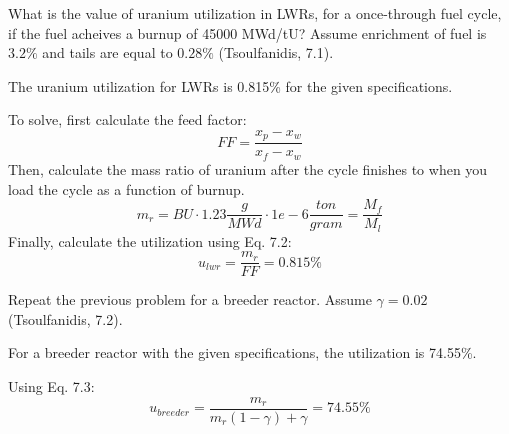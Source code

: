 \documentclass[11pt,answers,addpoints]{exam}
\begin{document}
\begin{questions}
        \question[50] What is the value of uranium utilization in LWRs, for a 
        once-through fuel cycle, if the fuel acheives a burnup of 45000 MWd/tU? 
        Assume enrichment of fuel is $3.2\%$ and tails are equal to $0.28\%$ 
        (Tsoulfanidis, 7.1).
        \begin{solution}
        The uranium utilization for LWRs is 0.815\% for the given specifications.

        To solve, first calculate the feed factor:
        \begin{equation}
            FF = \frac{x_p - x_w}{x_f - x_w}
        \end{equation}
        Then, calculate the mass ratio of uranium after the cycle finishes to when you load the cycle as a function of burnup.
        \begin{equation}
            m_r = BU \cdot 1.23 \frac{g}{MWd} \cdot 1e-6 \frac{ton}{gram} = \frac{M_f}{M_l}
        \end{equation}
        Finally, calculate the utilization using Eq. 7.2:
        \begin{equation}
            u_{lwr} = \frac{m_r}{FF} = 0.815\%
        \end{equation}
        \end{solution}
        \question[50] Repeat the previous problem for a breeder reactor. Assume 
        $\gamma = 0.02$ (Tsoulfanidis, 7.2).
        \begin{solution}
        For a breeder reactor with the given specifications, the utilization is 74.55\%.

        Using Eq. 7.3:
        \begin{equation}
            u_{breeder} = \frac{m_r}{m_r (1 - \gamma) + \gamma} = 74.55\%
        \end{equation}
        \end{solution}

\end{questions}
\end{document}
